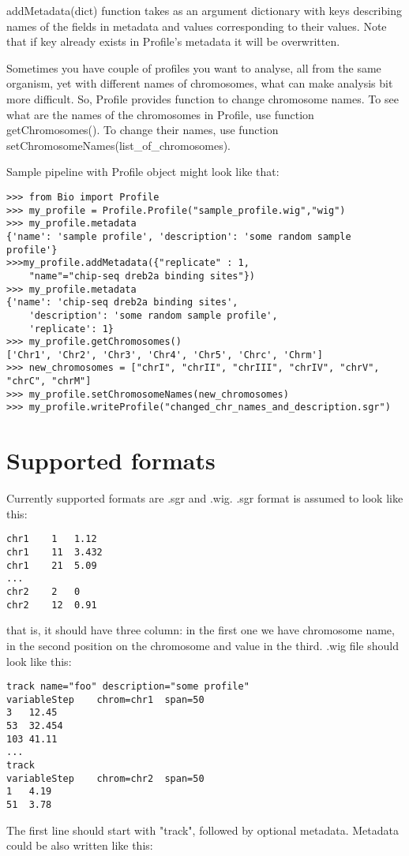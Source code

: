 \documentclass[a4paper,11pt,portrait]{article}
\begin{document}
addMetadata(dict) function takes as an argument dictionary
 with keys describing names of the fields in metadata
 and values corresponding to their values.
 Note that if key already exists in Profile's metadata
 it will be overwritten.

Sometimes you have couple of profiles you want to analyse,
 all from the same organism,
 yet with different names of chromosomes,
 what can make analysis bit more difficult.
 So, Profile provides function to change chromosome names.
 To see what are the names of the chromosomes in Profile,
 use function getChromosomes().
 To change their names, use function setChromosomeNames(list\_of\_chromosomes).

Sample pipeline with Profile object might look like that:

\begin{verbatim}
>>> from Bio import Profile
>>> my_profile = Profile.Profile("sample_profile.wig","wig")  
>>> my_profile.metadata 
{'name': 'sample profile', 'description': 'some random sample profile'}
>>>my_profile.addMetadata({"replicate" : 1,
	"name"="chip-seq dreb2a binding sites"})
>>> my_profile.metadata
{'name': 'chip-seq dreb2a binding sites',
	'description': 'some random sample profile',
	'replicate': 1}
>>> my_profile.getChromosomes()
['Chr1', 'Chr2', 'Chr3', 'Chr4', 'Chr5', 'Chrc', 'Chrm']
>>> new_chromosomes = ["chrI", "chrII", "chrIII", "chrIV", "chrV", "chrC", "chrM"] 
>>> my_profile.setChromosomeNames(new_chromosomes) 
>>> my_profile.writeProfile("changed_chr_names_and_description.sgr")
\end{verbatim}

\section{Supported formats}
\label{formats}

Currently supported formats are .sgr and .wig.
 .sgr format is assumed to look like this:

\begin{verbatim}
chr1	1	1.12
chr1	11	3.432
chr1	21	5.09
...
chr2	2	0
chr2	12	0.91
\end{verbatim}

that is, it should have three column:
 in the first one we have chromosome name,
 in the second position on the chromosome
 and value in the third.
 .wig file should look like this:

\begin{verbatim}
track name="foo" description="some profile"
variableStep	chrom=chr1	span=50
3	12.45
53	32.454
103	41.11
...
track
variableStep	chrom=chr2	span=50
1	4.19
51	3.78
\end{verbatim}
The first line should start with "track", followed by optional metadata.
 Metadata could be also written like this:
\end{document}
